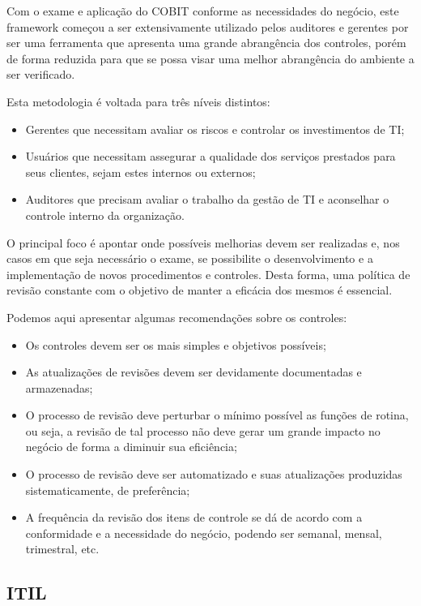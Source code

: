 Com o exame e aplicação do COBIT conforme as necessidades do negócio, este framework começou a ser extensivamente utilizado pelos auditores e gerentes por ser uma ferramenta que apresenta uma grande abrangência dos controles, porém de forma reduzida para que se possa visar uma melhor abrangência do ambiente a ser verificado.

Esta metodologia é voltada para três níveis distintos:
\begin{itemize}
    \item Gerentes que necessitam avaliar os riscos e controlar os investimentos de TI;
    \item Usuários que necessitam assegurar a qualidade dos serviços prestados para seus clientes, sejam estes internos ou externos;
    \item Auditores que precisam avaliar o trabalho da gestão de TI e aconselhar o controle interno da organização.
\end{itemize}

O principal foco é apontar onde possíveis melhorias devem ser realizadas e, nos casos em que seja necessário o exame, se possibilite o desenvolvimento e a implementação de novos procedimentos e controles.  Desta forma, uma política de revisão constante com o objetivo de manter a eficácia dos mesmos é essencial.

Podemos aqui apresentar algumas recomendações sobre os controles:
\begin{itemize}
    \item Os controles devem ser os mais simples e objetivos possíveis;
    \item As atualizações de revisões devem ser devidamente documentadas e armazenadas;
    \item O processo de revisão deve perturbar o mínimo possível as funções de rotina, ou seja, a revisão de tal processo não deve gerar um grande impacto no negócio de forma a diminuir sua eficiência;
    \item O processo de revisão deve ser automatizado e suas atualizações produzidas sistematicamente, de preferência;
    \item A frequência da revisão dos itens de controle se dá de acordo com a conformidade e a necessidade do negócio, podendo ser semanal, mensal, trimestral, etc.
\end{itemize}
\subsection{ITIL}	
	\cite{ITIL-OVERVIEW}

